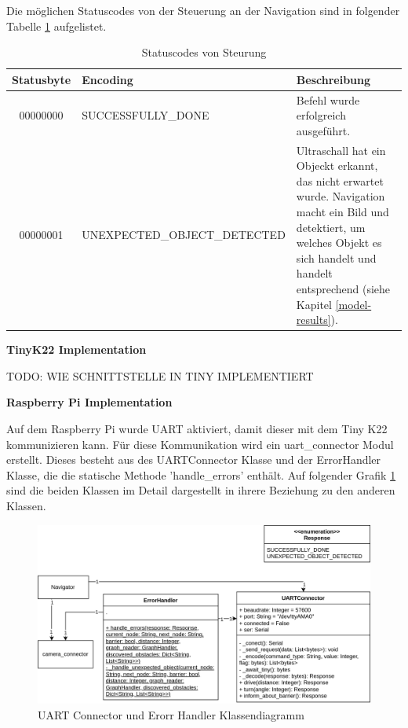 Die möglichen Statuscodes von der Steuerung an der Navigation sind in folgender Tabelle \ref{table:statuscodes} aufgelistet.

\begin{table}[H]
\centering
\small
\begin{tabularx}{\textwidth}{|c|l|X|}
\hline
  \textbf{Statusbyte} & \textbf{Encoding} & \textbf{Beschreibung} \\
  \hline
      00000000&SUCCESSFULLY\_DONE&Befehl wurde erfolgreich ausgeführt. \\
  \hline
00000001&UNEXPECTED\_OBJECT\_DETECTED &Ultraschall hat ein Objeckt erkannt, das nicht erwartet wurde. Navigation macht ein Bild und detektiert, um welches Objekt es sich handelt und handelt entsprechend (siehe Kapitel \ref{model-results}).\\
  \hline
\end{tabularx}
\caption{Statuscodes von Steurung}
\label{table:statuscodes}
\end{table}

\textbf{TinyK22 Implementation}

TODO: WIE SCHNITTSTELLE IN TINY IMPLEMENTIERT

\textbf{Raspberry Pi Implementation}

Auf dem Raspberry Pi wurde UART aktiviert, damit dieser mit dem Tiny K22 kommunizieren kann.
Für diese Kommunikation wird ein uart\_connector Modul erstellt. Dieses besteht aus des UARTConnector Klasse und der ErrorHandler Klasse, die die statische Methode 'handle\_errors' enthält. Auf folgender Grafik \ref{fig:uart-connector-nav} sind die beiden Klassen im Detail dargestellt in ihrere Beziehung zu den anderen Klassen.

\begin{figure}[H]
\centering
\includegraphics[width=\textwidth]{assets/IT/robot-sw-architecture-uart-connector.png}
\caption{UART Connector und Erorr Handler Klassendiagramm}
\label{fig:uart-connector-nav}
\end{figure}

